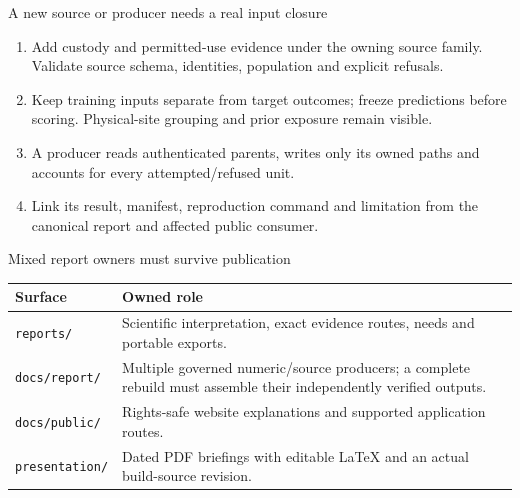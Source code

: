 \begin{frame}{A new source or producer needs a real input closure}
\begin{enumerate}
\item Add custody and permitted-use evidence under the owning source family. Validate source schema, identities, population and explicit refusals.
\item Keep training inputs separate from target outcomes; freeze predictions before scoring. Physical-site grouping and prior exposure remain visible.
\item A producer reads authenticated parents, writes only its owned paths and accounts for every attempted/refused unit.
\item Link its result, manifest, reproduction command and limitation from the canonical report and affected public consumer.
\end{enumerate}
\end{frame}

\begin{frame}{Mixed report owners must survive publication}
\small
\begin{tabular}{p{.26\linewidth}p{.60\linewidth}}
\toprule
Surface & Owned role \\
\midrule
\texttt{reports/} & Scientific interpretation, exact evidence routes, needs and portable exports. \\
\texttt{docs/report/} & Multiple governed numeric/source producers; a complete rebuild must assemble their independently verified outputs. \\
\texttt{docs/public/} & Rights-safe website explanations and supported application routes. \\
\texttt{presentation/} & Dated PDF briefings with editable LaTeX and an actual build-source revision. \\
\bottomrule
\end{tabular}
\end{frame}

